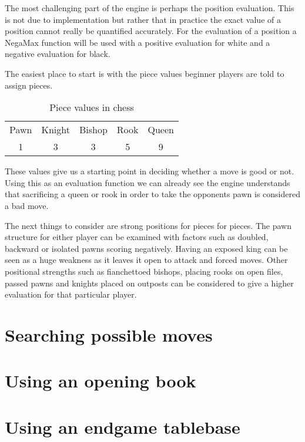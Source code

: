 \documentclass[11pt]{report}
\begin{document}
The most challenging part of the engine is perhaps the position evaluation. This is not due to implementation but rather that in practice the exact value of a position cannot really be quantified accurately. For the evaluation of a position a NegaMax function will be used with a positive evaluation for white and a negative evaluation for black.\newline


The easiest place to start is with the piece values beginner players are told to assign pieces.

\begin{table}[h]
\centering
\begin{tabular}{ccccc}
Pawn & Knight & Bishop & Rook & Queen \\
1    & 3      & 3      & 5    & 9    
\end{tabular}
\caption{Piece values in chess}
\end{table}

These values give us a starting point in deciding whether a move is good or not. Using this as an evaluation function we can already see the engine understands that sacrificing a queen or rook in order to take the opponents pawn is considered a bad move.\newline

The next things to consider are strong positions for pieces for pieces. The pawn structure for either player can be examined with factors such as doubled, backward or isolated pawns scoring negatively. Having an exposed king can be seen as a huge weakness as it leaves it open to attack and forced moves. Other positional strengths such as fianchettoed bishops, placing rooks on open files, passed pawns and knights placed on outposts can be considered to give a higher evaluation for that particular player.



\section{Searching possible moves}

\section{Using an opening book}

\section{Using an endgame tablebase}
\end{document}
